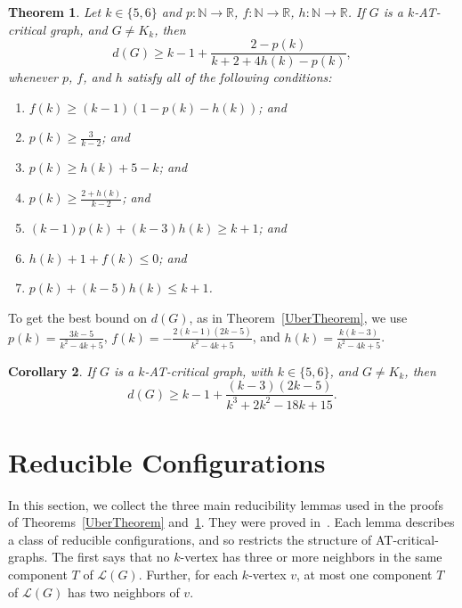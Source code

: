 \documentclass[12pt]{article}
\theoremstyle{plain}
\newtheorem{thm}{Theorem}[section]
\newtheorem{cor}[thm]{Corollary}
\theoremstyle{definition}
\newtheorem{defn}{Definition}
\theoremstyle{remark}
\newcommand{\fancy}[1]{\mathcal{#1}}
\newcommand{\IN}{\mathbb{N}}
\newcommand{\IR}{\mathbb{R}}
\renewcommand{\L}{\fancy{L}}
\newcommand{\func}[3]{#1\colon #2 \rightarrow #3}
\newcommand{\DefinedAs}{\mathrel{\mathop:}=}
\begin{document}
\begin{thm}\label{Uber56}
	Let $k \in\{5,6\}$ and $\func{p}{\IN}{\IR}$, $\func{f}{\IN}{\IR}$, $\func{h}{\IN}{\IR}$.  If $G$ is a $k$-AT-critical graph, and $G\ne K_k$, then 
	\[d(G) \ge k-1 + \frac{2-p(k)}{k+2 + 4h(k) - p(k)},\]
	whenever $p$, $f$, and $h$ satisfy all of the following conditions:
	\begin{enumerate}
	\item $f(k) \ge (k-1)(1- p(k) - h(k))$; and	
	    \item $p(k) \ge \frac{3}{k-2}$; and
		\item $p(k) \ge h(k) + 5 - k$; and
		\item $p(k) \ge \frac{2+h(k)}{k-2}$; and
		\item $(k-1)p(k) + (k-3)h(k) \ge k+1$; and
		\item $h(k) + 1 + f(k) \le 0$; and
		\item $p(k) + (k-5)h(k) \le k+1$.
	\end{enumerate}
\end{thm}

To get the best bound on $d(G)$, as in Theorem~\ref{UberTheorem}, we use $p(k)
= \frac{3k-5}{k^2 - 4k + 5}$, $f(k) = -\frac{2(k-1)(2k-5)}{k^2 - 4k + 5}$, and
$h(k) = \frac{k(k-3)}{k^2 - 4k + 5}$.
\begin{cor}\label{MinorCor}
If $G$ is a $k$-AT-critical graph, with $k\in\{5,6\}$, and $G\ne K_k$, then
 \[d(G) \ge k-1 + \frac{(k-3)(2k-5)}{k^3 + 2k^2 - 18k + 15}.\]
\end{cor}

\section{Reducible Configurations}
In this section, we collect the three main reducibility lemmas used in the
proofs of Theorems~\ref{UberTheorem} and~\ref{Uber56}.  They were proved
in~\cite{OreVizing}.  Each lemma describes a class of reducible configurations,
and so restricts the structure of AT-critical-graphs.
%
The first says that no $k$-vertex has three or more neighbors in the same component
$T$ of $\L(G)$.  Further, for each $k$-vertex $v$,  at most one component $T$ of
$\L(G)$ has two neighbors of $v$.
\end{document}
